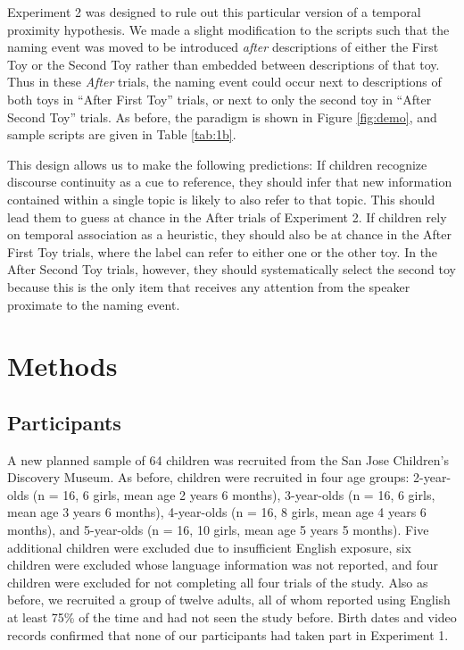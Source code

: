 \documentclass[man]{apa2}
\begin{document}
Experiment 2 was designed to rule out this particular version of a temporal proximity hypothesis.  We made a slight modification to the scripts such that the naming event was moved to be introduced \emph{after} descriptions of either the First Toy or the Second Toy rather than embedded between descriptions of that toy.  
Thus in these \emph{After} trials, the naming event could occur next to descriptions of both toys in ``After First Toy'' trials, or next to only the second toy in ``After Second Toy'' trials. As before, the paradigm is shown in Figure \ref{fig:demo}, and sample scripts are given in Table \ref{tab:1b}.  

This design allows us to make the following predictions: If children recognize discourse continuity as a cue to reference, they should infer that new information contained within a single topic is likely to also refer to that topic. This should lead them to guess at chance in the After trials of Experiment 2. If children rely on temporal association as a heuristic, they should also be at chance in the After First Toy trials, where the label can refer to either one or the other toy.  In the After Second Toy trials, however, they should systematically select the second toy because this is the only item that receives any attention from the speaker proximate to the naming event. 
 
\section{Methods}

\subsection{Participants}

A new planned sample of 64 children was recruited from the San Jose Children's Discovery Museum. As before, children were recruited in four age groups: 2-year-olds (n = 16, 6 girls, mean age 2 years 6 months), 3-year-olds  (n = 16, 6 girls, mean age 3 years 6 months), 4-year-olds (n = 16, 8 girls, mean age 4 years 6 months), and 5-year-olds (n = 16, 10 girls, mean age 5 years 5 months).  Five additional children were excluded due to insufficient English exposure, six children were excluded whose language information was not reported, and four children were excluded for not completing all four trials of the study.  Also as before, we recruited a group of twelve adults, all of whom reported using English at least 75\% of the time and had not seen the study before.  Birth dates and video records confirmed that none of our participants had taken part in Experiment 1. 
\end{document}
